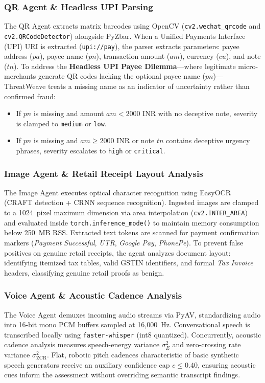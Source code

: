 \documentclass[conference]{IEEEtran}
\begin{document}
\subsubsection{QR Agent \& Headless UPI Parsing}
The QR Agent extracts matrix barcodes using OpenCV (\texttt{cv2.wechat\_qrcode} and \texttt{cv2.QRCodeDetector}) alongside PyZbar. When a Unified Payments Interface (UPI) URI is extracted (\texttt{upi://pay}), the parser extracts parameters: payee address ($pa$), payee name ($pn$), transaction amount ($am$), currency ($cu$), and note ($tn$). To address the \textbf{Headless UPI Payee Dilemma}—where legitimate micro-merchants generate QR codes lacking the optional payee name ($pn$)—ThreatWeave treats a missing name as an indicator of uncertainty rather than confirmed fraud:
\begin{itemize}
    \item If $pn$ is missing and amount $am < 2000 \text{ INR}$ with no deceptive note, severity is clamped to \texttt{medium} or \texttt{low}.
    \item If $pn$ is missing and $am \ge 2000 \text{ INR}$ or note $tn$ contains deceptive urgency phrases, severity escalates to \texttt{high} or \texttt{critical}.
\end{itemize}

\subsubsection{Image Agent \& Retail Receipt Layout Analysis}
The Image Agent executes optical character recognition using EasyOCR (CRAFT detection + CRNN sequence recognition). Ingested images are clamped to a 1024~pixel maximum dimension via area interpolation (\texttt{cv2.INTER\_AREA}) and evaluated inside \texttt{torch.inference\_mode()} to maintain memory consumption below 250~MB RSS. Extracted text tokens are scanned for payment confirmation markers (\textit{Payment Successful}, \textit{UTR}, \textit{Google Pay}, \textit{PhonePe}). To prevent false positives on genuine retail receipts, the agent analyzes document layout: identifying itemized tax tables, valid GSTIN identifiers, and formal \textit{Tax Invoice} headers, classifying genuine retail proofs as benign.

\subsubsection{Voice Agent \& Acoustic Cadence Analysis}
The Voice Agent demuxes incoming audio streams via PyAV, standardizing audio into 16-bit mono PCM buffers sampled at 16,000~Hz. Conversational speech is transcribed locally using \texttt{faster-whisper} (int8 quantized). Concurrently, acoustic cadence analysis measures speech-energy variance $\sigma_E^2$ and zero-crossing rate variance $\sigma_{\text{ZCR}}^2$. Flat, robotic pitch cadences characteristic of basic synthetic speech generators receive an auxiliary confidence cap $c \le 0.40$, ensuring acoustic cues inform the assessment without overriding semantic transcript findings.
\end{document}
